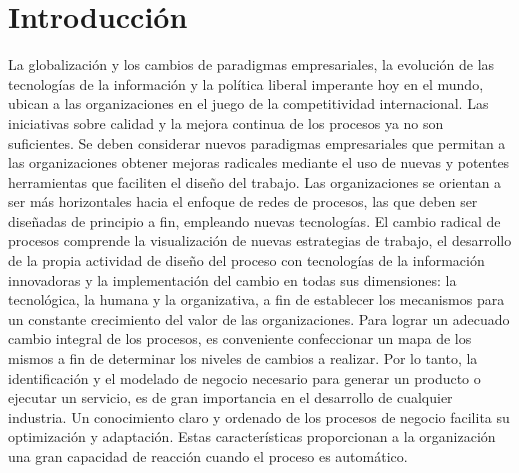 \chapter{Introducci\'on}
\label{Introduccion}



\setcounter{page}{1}

La globalización y los cambios de paradigmas empresariales, la evolución de las tecnologías de la información y la política liberal imperante hoy en el mundo, ubican a las organizaciones en el juego de la competitividad internacional. Las iniciativas sobre calidad y la mejora continua de los procesos ya no son suficientes. Se deben considerar nuevos paradigmas empresariales que permitan a las organizaciones obtener mejoras radicales mediante el uso de nuevas y potentes herramientas que faciliten el diseño del trabajo. Las organizaciones se orientan a ser más horizontales hacia el enfoque de redes de procesos, las que deben ser diseñadas de principio a fin, empleando nuevas tecnologías. El cambio radical de procesos comprende la visualización de nuevas estrategias de trabajo, el desarrollo de la propia actividad de diseño del proceso con tecnologías de la información innovadoras y la implementación del cambio en todas sus dimensiones: la tecnológica, la humana y la organizativa, a fin de establecer los mecanismos para un constante crecimiento del valor de las organizaciones. Para lograr un adecuado cambio integral de los procesos, es conveniente confeccionar un mapa de los mismos a fin de determinar los niveles de cambios a realizar. Por lo tanto, la identificación y el modelado de negocio necesario para generar un producto o ejecutar un servicio, es de gran importancia en el desarrollo de cualquier industria. Un conocimiento claro y ordenado de los procesos de negocio facilita su optimización y adaptación. Estas características proporcionan a la organización una gran capacidad de reacción cuando el proceso es automático.\\

